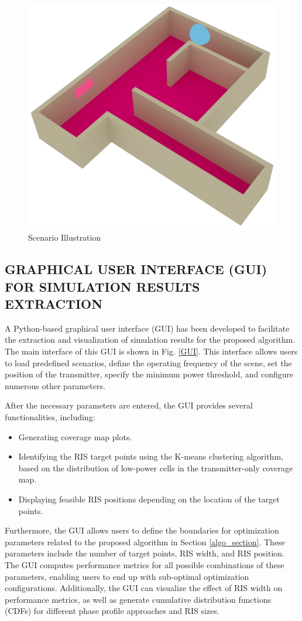 \documentclass{IEEEoj}
\begin{document}
\begin{figure}
	\centering \includegraphics[width=.8\linewidth]{Sim_Results/Scenario_Illustration.png}
	\caption{Scenario Illustration}
	\label{Scenario}
\end{figure}

\subsection{GRAPHICAL USER INTERFACE (GUI) FOR SIMULATION RESULTS EXTRACTION}
A Python-based graphical user interface (GUI) has been developed to facilitate the extraction and visualization of simulation results for the proposed algorithm. The main interface of this GUI is shown in Fig. \ref{GUI}. This interface allows users to load predefined scenarios, define the operating frequency of the scene, set the position of the transmitter, specify the minimum power threshold, and configure numerous other parameters.

After the necessary parameters are entered, the GUI provides several functionalities, including:  
\begin{itemize}
	\item Generating coverage map plots.
	\item Identifying the RIS target points using the K-means clustering algorithm, based on the distribution of low-power cells in the transmitter-only coverage map.
	\item Displaying feasible RIS positions depending on the location of the target points.
\end{itemize}

Furthermore, the GUI allows users to define the boundaries for optimization parameters related to the proposed algorithm in Section \ref{algo_section}. These parameters include the number of target points, RIS width, and RIS position. The GUI computes performance metrics for all possible combinations of these parameters, enabling users to end up with sub-optimal optimization configurations. Additionally, the GUI can visualize the effect of RIS width on performance metrics, as well as generate cumulative distribution functions (CDFs) for different phase profile approaches and RIS sizes.
\end{document}
